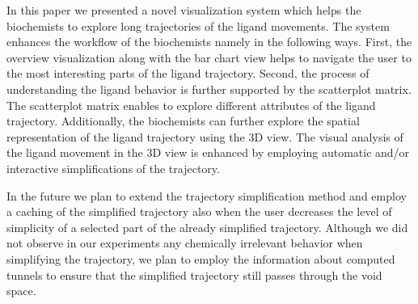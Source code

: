 In this paper we presented a novel visualization system which helps the biochemists to explore long trajectories of the ligand movements.
The system enhances the workflow of the biochemists namely in the following ways.
First, the overview visualization along with the bar chart view helps to navigate the user to the most interesting parts of the ligand trajectory.
Second, the process of understanding the ligand behavior is further supported by the scatterplot matrix.
The scatterplot matrix enables to explore different attributes of the ligand trajectory.
Additionally, the biochemists can further explore the spatial representation of the ligand trajectory using the 3D view.
The visual analysis of the ligand movement in the 3D view is enhanced by employing automatic and/or interactive simplifications of the trajectory.

In the future we plan to extend the trajectory simplification method and employ a caching of the simplified trajectory also when the user decreases the level of simplicity of a selected part of the already simplified trajectory.
Although we did not observe in our experiments any chemically irrelevant behavior when simplifying the trajectory, we plan to employ the information about computed tunnels to ensure that the simplified trajectory still passes through the void space.

